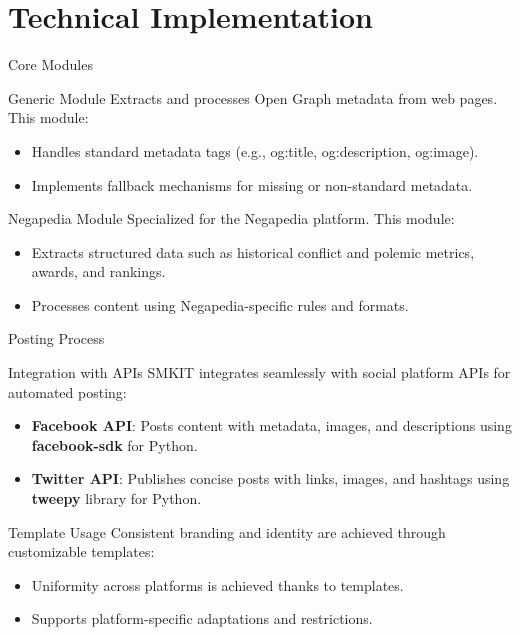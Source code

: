 \documentclass{beamer}
\begin{document}
\section{Technical Implementation}
    \begin{frame}{Core Modules}
        \begin{block}{Generic Module}
            Extracts and processes Open Graph metadata from web pages. This module:
            \begin{itemize}
                \item Handles standard metadata tags (e.g., og:title, og:description, og:image).
                \item Implements fallback mechanisms for missing or non-standard metadata.
            \end{itemize}
        \end{block}

        \begin{block}{Negapedia Module}
            Specialized for the Negapedia platform.
            This module:
            \begin{itemize}
                \item Extracts structured data such as historical conflict and polemic metrics, awards, and rankings.
                \item Processes content using Negapedia-specific rules and formats.
            \end{itemize}
        \end{block}
    \end{frame}

    \begin{frame}{Posting Process}
        \begin{block}{Integration with APIs}
            SMKIT integrates seamlessly with social platform APIs for automated posting:
            \begin{itemize}
                \item \textbf{Facebook API}: Posts content with metadata, images, and descriptions using \textbf{facebook-sdk} for Python.
                \item \textbf{Twitter API}: Publishes concise posts with links, images, and hashtags using \textbf{tweepy} library  for Python.
            \end{itemize}
        \end{block}
    
        \begin{block}{Template Usage}
            Consistent branding and identity are achieved through customizable templates:
            \begin{itemize}
                \item Uniformity across platforms is achieved thanks to templates.
                \item Supports platform-specific adaptations and restrictions.
            \end{itemize}
        \end{block}
    \end{frame}
\end{document}

